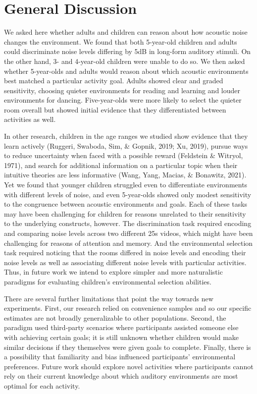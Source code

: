 \documentclass[10pt, letterpaper]{article}
\begin{document}
\hypertarget{general-discussion}{%
\section{General Discussion}\label{general-discussion}}

We asked here whether adults and children can reason about how acoustic
noise changes the environment. We found that both 5-year-old children
and adults could discriminate noise levels differing by 5dB in long-form
auditory stimuli. On the other hand, 3- and 4-year-old children were
unable to do so. We then asked whether 5-year-olds and adults would
reason about which acoustic environments best matched a particular
activity goal. Adults showed clear and graded sensitivity, choosing
quieter environments for reading and learning and louder environments
for dancing. Five-year-olds were more likely to select the quieter room
overall but showed initial evidence that they differentiated between
activities as well.

In other research, children in the age ranges we studied show evidence
that they learn actively (Ruggeri, Swaboda, Sim, \& Gopnik, 2019; Xu,
2019), pursue ways to reduce uncertainty when faced with a possible
reward (Feldstein \& Witryol, 1971), and search for additional
information on a particular topic when their intuitive theories are less
informative (Wang, Yang, Macias, \& Bonawitz, 2021). Yet we found that
younger children struggled even to differentiate environments with
different levels of noise, and even 5-year-olds showed only modest
sensitivity to the congruence between acoustic environments and goals.
Each of these tasks may have been challenging for children for reasons
unrelated to their sensitivity to the underlying constructs, however.
The discrimination task required encoding and comparing noise levels
across two different 25s videos, which might have been challenging for
reasons of attention and memory. And the environmental selection task
required noticing that the rooms differed in noise levels and encoding
their noise levels as well as associating different noise levels with
particular activities. Thus, in future work we intend to explore simpler
and more naturalistic paradigms for evaluating children's environmental
selection abilities.

There are several further limitations that point the way towards new
experiments. First, our research relied on convenience samples and so
our specific estimates are not broadly generalizable to other
populations. Second, the paradigm used third-party scenarios where
participants assisted someone else with achieving certain goals; it is
still unknown whether children would make similar decisions if they
themselves were given goals to complete. Finally, there is a possibility
that familiarity and bias influenced participants' environmental
preferences. Future work should explore novel activities where
participants cannot rely on their current knowledge about which auditory
environments are most optimal for each activity.
\end{document}
